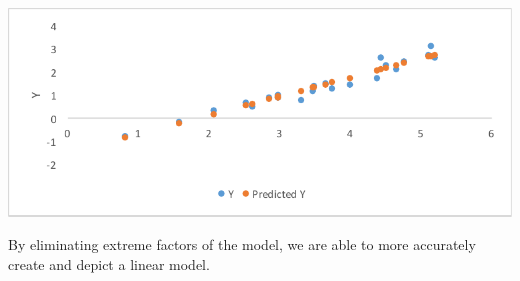 \documentclass[10pt,letterpaper]{article}
\begin{document}
			\newline \newline
			\centerline{\includegraphics{Picture11.pdf}}
			\newline \newline
			By eliminating extreme factors of the model, we are able to more accurately create and depict a linear model. 
\end{document}
